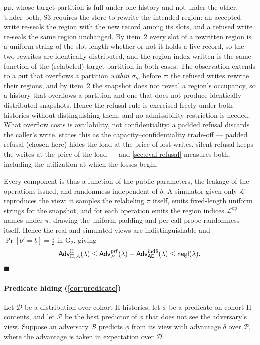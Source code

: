 \begin{enumerate}
$\mathsf{put}$ whose target partition is full under one history and not under the other. Under both,
S3 requires the store to rewrite the intended region: an accepted write re-seals the region with the
new record among its slots, and a refused write re-seals the same region unchanged. By item~2 every
slot of a rewritten region is a uniform string of the slot length whether or not it holds a live
record, so the two rewrites are identically distributed, and the region index written is the same
function of the (relabeled) target partition in both cases. The observation extends to a
$\mathsf{put}$ that overflows a partition \emph{within} $\sigma_b$, before $\tau$: the refused writes
rewrite their regions, and by item~2 the snapshot does not reveal a region's occupancy, so a history
that overflows a partition and one that does not produce identically distributed snapshots. Hence
the refusal rule is exercised freely under both histories without distinguishing them, and no
admissibility restriction is needed. What overflow costs is availability, not confidentiality: a
padded refusal discards the caller's write.  states this as the
capacity--confidentiality trade-off --- padded refusal (chosen here) hides the load at the price of
lost writes, silent refusal keeps the writes at the price of the load --- and \cref{sec:eval-refusal}
measures both, including the utilization at which the losses begin.
\end{enumerate}

Every component is thus a function of the public parameters, the leakage of the operations issued,
and randomness independent of $b$. A simulator given only $\mathcal{L}$ reproduces the view: it
samples the relabeling $\pi$ itself, emits fixed-length uniform strings for the snapshot, and for
each operation emits the region indices $\mathcal{L}^{\mathrm{op}}$ names under $\pi$, drawing the
uniform padding and per-call probe randomness itself. Hence the real and simulated views are
indistinguishable and $\Pr[b'=b] = \tfrac{1}{2}$ in $\mathrm{G}_2$, giving
\[
\mathsf{Adv}^{\mathrm{H}}_{\Pi,\mathcal{A}}(\lambda) \le \mathsf{Adv}^{\mathrm{prf}}_{F}(\lambda) +
\mathsf{Adv}^{\mathrm{ind\$}}_{\mathsf{AE}}(\lambda) \le \mathsf{negl}(\lambda).
\]
\hfill$\blacksquare$

\paragraph{Predicate hiding (\cref{cor:predicate})} Let $\mathcal{D}$ be a distribution over
cohort-H histories, let $\phi$ be a predicate on cohort-H contents, and let $\mathcal{P}$ be the
best predictor of $\phi$ that does not see the adversary's view. Suppose an adversary $\mathcal{B}$
predicts $\phi$ from its view with advantage $\delta$ over $\mathcal{P}$, where the advantage is
taken in expectation over $\mathcal{D}$.

